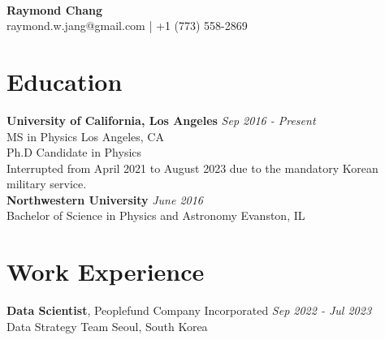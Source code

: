 \documentclass[margin,line]{./templates/resume}
\begin{document}
{\sc \hspace*{4mm}\vspace{0mm}\\
\LARGE \textbf{Raymond Chang}}
\vspace{1mm}\\
\hspace*{112mm} \small raymond.w.jang@gmail.com | +1 (773) 558-2869
\vspace*{1mm}
\begin{resume}


\section{\mysidestyle Education}
\textbf{University of California, Los Angeles} \hfill \textsl{Sep 2016 - Present}\\
    MS in Physics \hfill Los Angeles, CA\\
    Ph.D Candidate in Physics \hfill\\
  \hspace*{2mm} \textbullet \hspace*{0.5mm} Interrupted from April 2021 to August 2023 due to the mandatory Korean military service.
\vspace{.2mm}\\
\textbf{Northwestern University} \hfill \textsl{June 2016}\\
	Bachelor of Science in Physics and Astronomy \hfill Evanston, IL


\section{\mysidestyle Work Experience}
\textbf{Data Scientist}, Peoplefund Company Incorporated \hfill \textsl{Sep 2022 - Jul 2023}\\
Data Strategy Team \hfill Seoul, South Korea


\end{resume}
\end{document}
